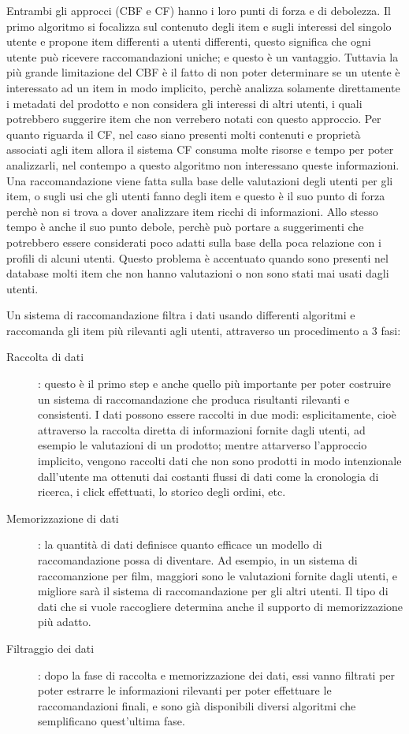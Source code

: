 Entrambi gli approcci (CBF e CF) hanno i loro punti di forza e di debolezza. Il primo algoritmo si focalizza sul contenuto degli item e
sugli interessi del singolo utente e propone item differenti a utenti differenti, questo significa che ogni utente può ricevere 
raccomandazioni uniche; e questo è un vantaggio. 
Tuttavia la più grande limitazione del CBF è il fatto di non poter determinare se un utente è interessato ad un item in modo implicito,
perchè analizza solamente direttamente i metadati del prodotto e non considera gli interessi di altri utenti, i quali potrebbero 
suggerire item che non verrebero notati con questo approccio.
Per quanto riguarda il CF, nel caso siano presenti molti contenuti e proprietà associati agli item allora il sistema CF consuma molte 
risorse e tempo per poter analizzarli, nel contempo a questo algoritmo non interessano queste informazioni. Una raccomandazione 
viene fatta sulla base delle valutazioni degli utenti per gli item, o sugli usi che gli utenti fanno degli item e questo è il suo punto 
di forza perchè non si trova a dover analizzare item ricchi di informazioni. Allo stesso tempo è anche il suo punto debole, perchè può
portare a suggerimenti che potrebbero essere considerati poco adatti sulla base della poca relazione con i profili di alcuni utenti. 
Questo problema è accentuato quando sono presenti nel database molti item che non hanno valutazioni o non sono stati mai usati dagli 
utenti.
\cite{model-based-approach-for-collaborative-filtering}

Un sistema di raccomandazione filtra i dati usando differenti algoritmi e raccomanda gli item più rilevanti agli utenti, attraverso 
un procedimento a 3 fasi:

\begin{description}
	\item[Raccolta di dati]: questo è il primo step e anche quello più importante per poter costruire un sistema di 
	raccomandazione che produca risultanti rilevanti e consistenti. I dati possono essere raccolti in due modi: esplicitamente,
	cioè attraverso la raccolta diretta di informazioni fornite dagli utenti, ad esempio le valutazioni di un prodotto; mentre 
	attarverso l'approccio implicito, vengono raccolti dati che non sono prodotti in modo intenzionale dall'utente ma ottenuti
	dai costanti flussi di dati come la cronologia di ricerca, i click effettuati, lo storico degli ordini, etc.
	\item[Memorizzazione di dati]: la quantità di dati definisce quanto efficace un modello di raccomandazione possa di
	diventare. Ad esempio, in un sistema di raccomanzione per film, maggiori sono le valutazioni fornite dagli utenti, e 
	migliore sarà il sistema di raccomandazione per gli altri utenti. Il tipo di dati che si vuole raccogliere determina
	anche il supporto di memorizzazione più adatto.   
	\item[Filtraggio dei dati]: dopo la fase di raccolta e memorizzazione dei dati, essi vanno filtrati per poter estrarre
	le informazioni rilevanti per poter effettuare le raccomandazioni finali, e sono già disponibili diversi algoritmi che
	semplificano quest'ultima fase. 
\end{description}

